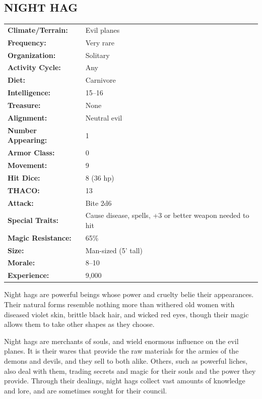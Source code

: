 \begin{multicols}{2}
\noindent
\begin{minipage}{\columnwidth}

\vspace{1em}

\subsection{NIGHT HAG}

\noindent \begin{tabular}{p{}p{}}
\textbf{Climate/Terrain:}	& Evil planes	\\
\textbf{Frequency:} 		& Very rare	\\
\textbf{Organization:} 		& Solitary	\\
\textbf{Activity Cycle:} 	& Any	\\
\textbf{Diet:} 				& Carnivore	\\
\textbf{Intelligence:} 		& 15--16	\\
\textbf{Treasure:} 			& None	\\
\textbf{Alignment:} 		& Neutral evil	\\
\hline
\textbf{Number Appearing:} 	& 1	\\
\textbf{Armor Class:} 		& 0	\\
\textbf{Movement:} 			& 9	\\
\textbf{Hit Dice:} 			& 8 (36 hp)	\\
\textbf{THACO:} 			& 13	\\
\textbf{Attack:} 			& Bite 2d6	\\
\textbf{Special Traits:} & Cause disease, spells, +3 or better weapon needed to hit	\\
\textbf{Magic Resistance:} 	& 65\%	\\
\textbf{Size:} 				& Man-sized (5' tall)	\\
\textbf{Morale:} 			& 8--10	\\
\textbf{Experience:} 		& 9,000	\\ %
\end{tabular}

\end{minipage}

Night hags are powerful beings whose power and cruelty belie their appearances. Their natural forms resemble nothing more than withered old women with diseased violet skin, brittle black hair, and wicked red eyes, though their magic allows them to take other shapes as they choose.

Night hags are merchants of souls, and wield enormous influence on the evil planes. It is their wares that provide the raw materials for the armies of the demons and devils, and they sell to both alike. Others, such as powerful liches, also deal with them, trading secrets and magic for their souls and the power they provide. Through their dealings, night hags collect vast amounts of knowledge and lore, and are sometimes sought for their council. 


\end{multicols}
